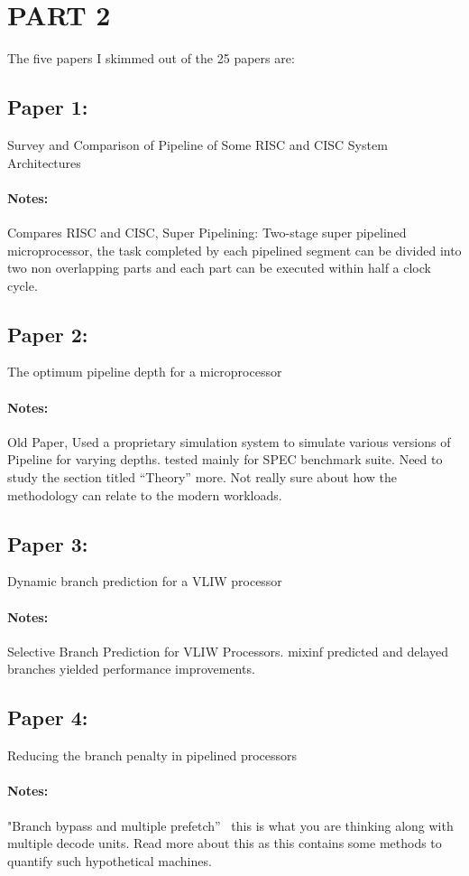 \documentclass{article}
\begin{document}
\section{PART 2}
The five papers I skimmed out of the 25 papers are: 

\subsection{Paper 1: }
Survey and Comparison of Pipeline of Some RISC and CISC System Architectures
\paragraph{Notes: }Compares RISC and CISC, 
Super Pipelining: Two-stage super pipelined microprocessor, the task completed by each pipelined segment can be divided into two non overlapping parts and each part can be executed within half a clock cycle.

\subsection{Paper 2:}
The optimum pipeline depth for a microprocessor
\paragraph{Notes: }Old Paper, 
Used a proprietary simulation system to simulate various versions of Pipeline for varying depths. tested mainly for SPEC benchmark suite. Need to study the section titled “Theory” more.
Not really sure about how the methodology can relate to the modern workloads.

\subsection{Paper 3:}
Dynamic branch prediction for a VLIW processor
\paragraph{Notes: }Selective Branch Prediction for VLIW Processors. mixinf predicted and delayed branches yielded performance improvements.

\subsection{Paper 4:}
Reducing the branch penalty in pipelined processors
\paragraph{Notes: }"Branch bypass and multiple prefetch”  this is what you are thinking along with multiple decode units. Read more about this as this contains some methods to quantify such hypothetical machines.
\end{document}

